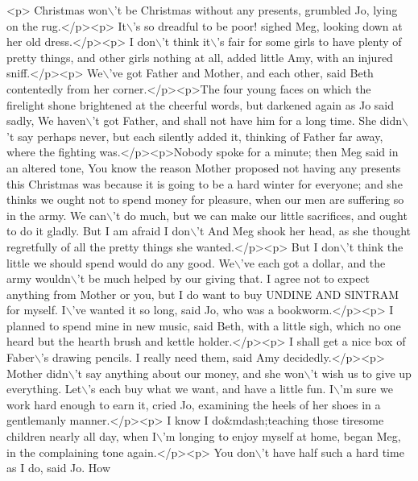 \begin{DoxyCode}
\textcolor{stringliteral}{}
\textcolor{stringliteral}{<p> Christmas won\(\backslash\)'t be Christmas without any presents,  grumbled Jo, lying on the rug.</p><p> It\(\backslash\)'s so
       dreadful to be poor!  sighed Meg, looking down at her old dress.</p><p> I don\(\backslash\)'t think it\(\backslash\)'s fair for some
       girls to have plenty of pretty things, and other girls nothing at all,  added little Amy, with an injured
       sniff.</p><p> We\(\backslash\)'ve got Father and Mother, and each other,  said Beth contentedly from her corner.</p><p>The four
       young faces on which the firelight shone brightened at the cheerful words, but darkened again as Jo said
       sadly,  We haven\(\backslash\)'t got Father, and shall not have him for a long time.  She didn\(\backslash\)'t say  perhaps never,  but
       each silently added it, thinking of Father far away, where the fighting was.</p><p>Nobody spoke for a
       minute; then Meg said in an altered tone,  You know the reason Mother proposed not having any presents this
       Christmas was because it is going to be a hard winter for everyone; and she thinks we ought not to spend money for
       pleasure, when our men are suffering so in the army. We can\(\backslash\)'t do much, but we can make our little
       sacrifices, and ought to do it gladly. But I am afraid I don\(\backslash\)'t  And Meg shook her head, as she thought regretfully
       of all the pretty things she wanted.</p><p> But I don\(\backslash\)'t think the little we should spend would do any good.
       We\(\backslash\)'ve each got a dollar, and the army wouldn\(\backslash\)'t be much helped by our giving that. I agree not to expect
       anything from Mother or you, but I do want to buy UNDINE AND SINTRAM for myself. I\(\backslash\)'ve wanted it so long, 
       said Jo, who was a bookworm.</p><p> I planned to spend mine in new music,  said Beth, with a little sigh,
       which no one heard but the hearth brush and kettle holder.</p><p> I shall get a nice box of Faber\(\backslash\)'s drawing
       pencils. I really need them,  said Amy decidedly.</p><p> Mother didn\(\backslash\)'t say anything about our money, and she
       won\(\backslash\)'t wish us to give up everything. Let\(\backslash\)'s each buy what we want, and have a little fun. I\(\backslash\)'m sure we work
       hard enough to earn it,  cried Jo, examining the heels of her shoes in a gentlemanly manner.</p><p> I know I
       do&mdash;teaching those tiresome children nearly all day, when I\(\backslash\)'m longing to enjoy myself at home,  began
       Meg, in the complaining tone again.</p><p> You don\(\backslash\)'t have half such a hard time as I do,  said Jo.  How
}
\end{DoxyCode}
